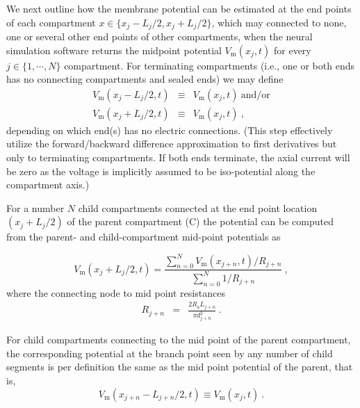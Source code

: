 We next outline how the membrane potential can be estimated at the end points of each compartment $x \in \{x_j-L_j/2, x_j+L_j/2\}$, 
which may connected to none, one or several other end points of other compartments, 
when the neural simulation software returns the midpoint potential $V_\mathrm{m}(x_j, t)$ for every $j \in \{1, \cdots, N \}$ compartment. 
For terminating compartments (i.e., one or both ends has no connecting compartments and sealed ends) we may define
%
\begin{eqnarray}
V_\mathrm{m}(x_j - L_j/2, t) &\equiv& V_\mathrm{m}(x_j, t)~\mathrm{and/or} \nonumber \\
V_\mathrm{m}(x_j + L_j/2, t) &\equiv& V_\mathrm{m}(x_j, t)~, \nonumber
\end{eqnarray} 
%
depending on which end(s) has no electric connections. 
(This step effectively utilize the forward/backward difference approximation to first derivatives but only to terminating compartments. 
If both ends terminate, the axial current will be zero as the voltage is implicitly assumed to be iso-potential along the compartment axis.)

For a number $N$ child compartments connected at the end point location $(x_j+L_j/2)$ of the parent compartment (C) the potential can be computed from the parent- and child-compartment mid-point potentials as \cite{Hagen2018}

\begin{equation}
V_\mathrm{m}(x_j+L_j/2, t) = \frac{\sum_{n=0}^N V_\mathrm{m}(x_{j+n}, t) / R_{j+n}}{\sum_{n=0}^N 1 / R_{j+n}}~, 
\label{eq:LFPy_V_connect_point}
\end{equation}
% 
where the connecting node to mid point resistances
%
\begin{eqnarray}
R_{j+n} &=& \frac{2 R_\mathrm{a}L_{j+n}}{\pi d_{j+n}^2} ~.
\end{eqnarray} 

For child compartments connecting to the mid point of the parent compartment, 
the corresponding potential at the branch point seen by any number of child segments is per definition the same as the mid point potential of the parent, that is, 
\begin{equation}
V_\mathrm{m}(x_{j+n}-L_{j+n} / 2, t) \equiv V_\mathrm{m}(x_j, t) ~.
\end{equation} 

